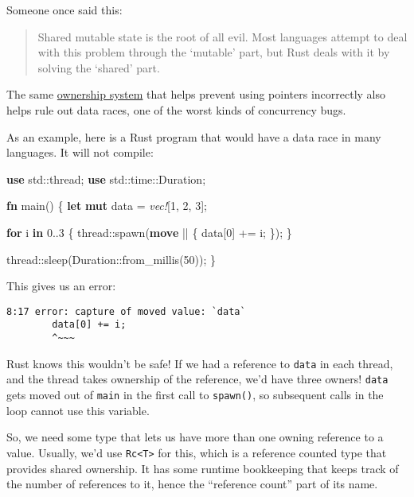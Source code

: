 \documentclass[a4paper,]{book}
\newenvironment{Shaded}{\begin{snugshade}}{\end{snugshade}}
\newcommand{\KeywordTok}[1]{\textcolor[rgb]{0.13,0.29,0.53}{\textbf{{#1}}}}
\newcommand{\DecValTok}[1]{\textcolor[rgb]{0.00,0.00,0.81}{{#1}}}
\newcommand{\PreprocessorTok}[1]{\textcolor[rgb]{0.56,0.35,0.01}{\textit{{#1}}}}
\newcommand{\NormalTok}[1]{{#1}}
\begin{document}
Someone once said this:

\begin{quote}
Shared mutable state is the root of all evil. Most languages attempt to
deal with this problem through the `mutable' part, but Rust deals with
it by solving the `shared' part.
\end{quote}

The same \protect\hyperlink{sec--ownership}{ownership system} that helps
prevent using pointers incorrectly also helps rule out data races, one
of the worst kinds of concurrency bugs.

As an example, here is a Rust program that would have a data race in
many languages. It will not compile:

\begin{Shaded}
\begin{Highlighting}[]
\KeywordTok{use} \NormalTok{std::thread;}
\KeywordTok{use} \NormalTok{std::time::Duration;}

\KeywordTok{fn} \NormalTok{main() \{}
    \KeywordTok{let} \KeywordTok{mut} \NormalTok{data = }\PreprocessorTok{vec!}\NormalTok{[}\DecValTok{1}\NormalTok{, }\DecValTok{2}\NormalTok{, }\DecValTok{3}\NormalTok{];}

    \KeywordTok{for} \NormalTok{i }\KeywordTok{in} \DecValTok{0.}\NormalTok{.}\DecValTok{3} \NormalTok{\{}
        \NormalTok{thread::spawn(}\KeywordTok{move} \NormalTok{|| \{}
            \NormalTok{data[}\DecValTok{0}\NormalTok{] += i;}
        \NormalTok{\});}
    \NormalTok{\}}

    \NormalTok{thread::sleep(Duration::from_millis(}\DecValTok{50}\NormalTok{));}
\NormalTok{\}}
\end{Highlighting}
\end{Shaded}

This gives us an error:

\begin{verbatim}
8:17 error: capture of moved value: `data`
        data[0] += i;
        ^~~~
\end{verbatim}

Rust knows this wouldn't be safe! If we had a reference to \texttt{data}
in each thread, and the thread takes ownership of the reference, we'd
have three owners! \texttt{data} gets moved out of \texttt{main} in the
first call to \texttt{spawn()}, so subsequent calls in the loop cannot
use this variable.

So, we need some type that lets us have more than one owning reference
to a value. Usually, we'd use \texttt{Rc\textless{}T\textgreater{}} for
this, which is a reference counted type that provides shared ownership.
It has some runtime bookkeeping that keeps track of the number of
references to it, hence the ``reference count'' part of its name.
\end{document}
